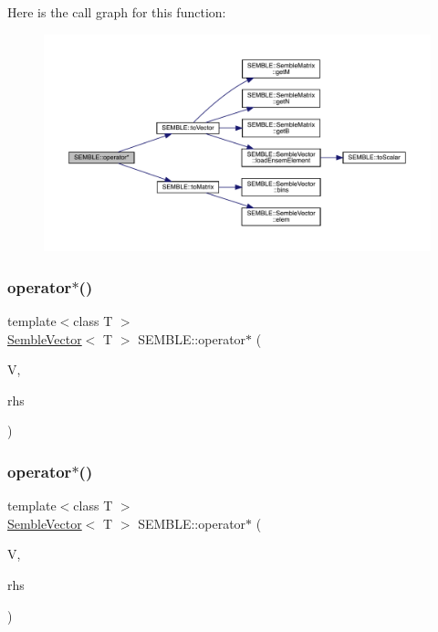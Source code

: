 Here is the call graph for this function\+:
\nopagebreak
\begin{figure}[H]
\begin{center}
\leavevmode
\includegraphics[width=350pt]{d7/dfd/namespaceSEMBLE_af35047ebae6e7da46390a840ba9d2440_cgraph}
\end{center}
\end{figure}
\mbox{\label{namespaceSEMBLE_a5a26d8f528ca309be35f6d92029bdab1}} 
\subsubsection{\texorpdfstring{operator$\ast$()}{operator*()}\hspace{0.1cm}{\footnotesize\ttfamily [4/20]}}
{\footnotesize\ttfamily template$<$class T $>$ \\
\mbox{\hyperlink{structSEMBLE_1_1SembleVector}{Semble\+Vector}}$<$ T $>$ S\+E\+M\+B\+L\+E\+::operator$\ast$ (\begin{DoxyParamCaption}\item[{const \mbox{\hyperlink{structSEMBLE_1_1SembleVector}{Semble\+Vector}}$<$ T $>$ \&}]{V,  }\item[{const T \&}]{rhs }\end{DoxyParamCaption})}

\mbox{\label{namespaceSEMBLE_adf8fefd101f5699d4a49b90d3f8b46c4}} 
\subsubsection{\texorpdfstring{operator$\ast$()}{operator*()}\hspace{0.1cm}{\footnotesize\ttfamily [5/20]}}
{\footnotesize\ttfamily template$<$class T $>$ \\
\mbox{\hyperlink{structSEMBLE_1_1SembleVector}{Semble\+Vector}}$<$ T $>$ S\+E\+M\+B\+L\+E\+::operator$\ast$ (\begin{DoxyParamCaption}\item[{const \mbox{\hyperlink{structSEMBLE_1_1SembleVector}{Semble\+Vector}}$<$ T $>$ \&}]{V,  }\item[{const typename \mbox{\hyperlink{structSEMBLE_1_1PromoteScalar}{Promote\+Scalar}}$<$ T $>$\+::Type \&}]{rhs }\end{DoxyParamCaption})}

